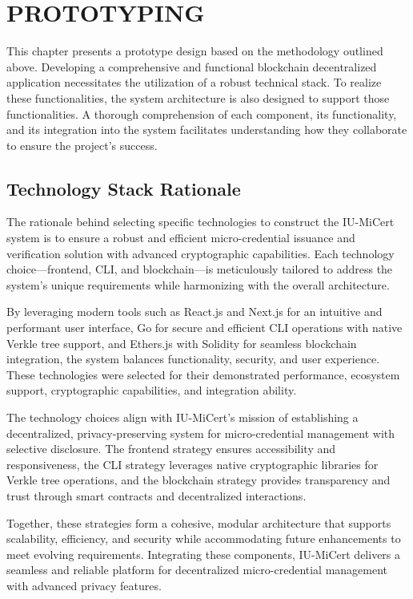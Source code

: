 \chapter{PROTOTYPING}
\label{ch:prototyping}

This chapter presents a prototype design based on the methodology outlined above. Developing a comprehensive and functional blockchain decentralized application necessitates the utilization of a robust technical stack. To realize these functionalities, the system architecture is also designed to support those functionalities. A thorough comprehension of each component, its functionality, and its integration into the system facilitates understanding how they collaborate to ensure the project's success.
\section{Technology Stack Rationale}

The rationale behind selecting specific technologies to construct the IU-MiCert system is to ensure a robust and efficient micro-credential issuance and verification solution with advanced cryptographic capabilities. Each technology choice—frontend, CLI, and blockchain—is meticulously tailored to address the system's unique requirements while harmonizing with the overall architecture.

By leveraging modern tools such as React.js and Next.js for an intuitive and performant user interface, Go for secure and efficient CLI operations with native Verkle tree support, and Ethers.js with Solidity for seamless blockchain integration, the system balances functionality, security, and user experience. These technologies were selected for their demonstrated performance, ecosystem support, cryptographic capabilities, and integration ability.

The technology choices align with IU-MiCert's mission of establishing a decentralized, privacy-preserving system for micro-credential management with selective disclosure. The frontend strategy ensures accessibility and responsiveness, the CLI strategy leverages native cryptographic libraries for Verkle tree operations, and the blockchain strategy provides transparency and trust through smart contracts and decentralized interactions.

Together, these strategies form a cohesive, modular architecture that supports scalability, efficiency, and security while accommodating future enhancements to meet evolving requirements. Integrating these components, IU-MiCert delivers a seamless and reliable platform for decentralized micro-credential management with advanced privacy features.

